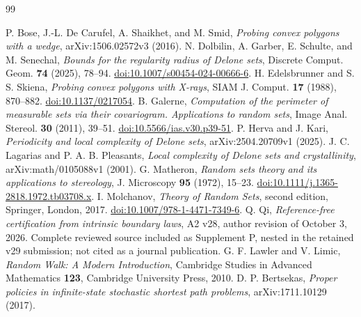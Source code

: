 \begin{thebibliography}{99}\raggedright
{}
P. Bose, J.-L. De Carufel, A. Shaikhet, and M. Smid,
\emph{Probing convex polygons with a wedge}, arXiv:1506.02572v3 (2016).
N. Dolbilin, A. Garber, E. Schulte, and M. Senechal,
\emph{Bounds for the regularity radius of Delone sets},
Discrete Comput. Geom. \textbf{74} (2025), 78--94.
\href{https://doi.org/10.1007/s00454-024-00666-6}{doi:10.1007/s00454-024-00666-6}.
H. Edelsbrunner and S. S. Skiena, \emph{Probing convex polygons with
X-rays}, SIAM J. Comput. \textbf{17} (1988), 870--882.
\href{https://doi.org/10.1137/0217054}{doi:10.1137/0217054}.
B. Galerne, \emph{Computation of the perimeter of measurable sets via
their covariogram. Applications to random sets}, Image Anal. Stereol.
\textbf{30} (2011), 39--51.
\href{https://doi.org/10.5566/ias.v30.p39-51}{doi:10.5566/ias.v30.p39-51}.
P. Herva and J. Kari, \emph{Periodicity and local complexity of Delone
sets}, arXiv:2504.20709v1 (2025).
J. C. Lagarias and P. A. B. Pleasants, \emph{Local complexity of Delone
sets and crystallinity}, arXiv:math/0105088v1 (2001).
G. Matheron, \emph{Random sets theory and its applications to stereology},
J. Microscopy \textbf{95} (1972), 15--23.
\href{https://doi.org/10.1111/j.1365-2818.1972.tb03708.x}{doi:10.1111/j.1365-2818.1972.tb03708.x}.
I. Molchanov, \emph{Theory of Random Sets}, second edition,
Springer, London, 2017.
\href{https://doi.org/10.1007/978-1-4471-7349-6}{doi:10.1007/978-1-4471-7349-6}.
Q. Qi, \emph{Reference-free certification from intrinsic boundary laws},
A2 v28, author revision of October 3, 2026. Complete reviewed source
included as Supplement P, nested in the retained v29 submission;
not cited as a journal publication.
G. F. Lawler and V. Limic, \emph{Random Walk: A Modern Introduction},
Cambridge Studies in Advanced Mathematics \textbf{123}, Cambridge
University Press, 2010.
D. P. Bertsekas, \emph{Proper policies in infinite-state stochastic
shortest path problems}, arXiv:1711.10129 (2017).
\end{thebibliography}
